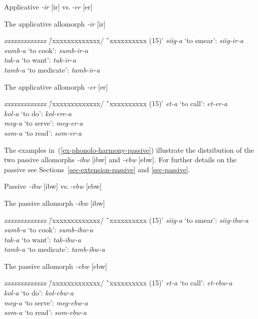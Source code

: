 \ea \label{ex-phonolo-harmony-applicative}
Applicative \textit{-ir} [ir] vs.\,\textit{-er} [er]
\begin{xlist}
\ex The applicative allomorph \textit{-ir} [ir]
\begin{tabbing}
 \textit{xxxxxxxxxxxxx} \= /xxxxxxxxxxxxx/ \=`xxxxxxxxxx (15)'\kill
	 \textit{siig-a}	\>`to smear':	\> \textit{siig-ir-a}\\
	 \textit{sumb-a}\>	`to cook':\>	 \textit{sumb-ir-a}\\
	 \textit{tak-a}	\> `to want':	\>  \textit{tak-ir-a}\\
	 \textit{tamb-a}	\> `to medicate':\>	  \textit{tamb-ir-a} 
\end{tabbing}	

\ex The applicative allomorph \textit{-er} [er]
\begin{tabbing}
 \textit{xxxxxxxxxxxxx} \= /xxxxxxxxxxxxx/ \=`xxxxxxxxxx (15)'\kill
	 \textit{et-a}	\>`to call':	\> \textit{et-er-a}\\
	 \textit{kol-a} \>`to do': \> \textit{kol-ere-a}\\
	 \textit{meg-a} \>`to serve': \>  \textit{meg-er-a}\\
	 \textit{som-a} \>`to read':\>  \textit{som-er-a}
\end{tabbing}	
\end{xlist}
\z

The examples in~(\ref{ex-phonolo-harmony-passive}) illustrate the distribution of the two passive allomorphs \textit{-ibw} [ibw] and \textit{-ebw} [ebw]. 
For further details on the passive see Sections~\ref{sec-extension-passive} and \ref{sec-passive}.

\ea Passive \textit{-ibw} [ibw] vs.\,\textit{-ebw} [ebw] \label{ex-phonolo-harmony-passive}
\begin{xlist}

\ex The passive allomorph  \textit{-ibw} [ibw]\label{ex-phonolo-harmony-passive-ibw}
\begin{tabbing}
 	 \textit{xxxxxxxxxxxxx} \= /xxxxxxxxxxxxx/ \=`xxxxxxxxxx (15)'\kill
	 \textit{siig-a}  \>`to smear': \>  \textit{siig-ibw-a}\\
	 \textit{sumb-a} \> `to cook':  \> \textit{sumb-ibw-a}\\
	 \textit{tak-a}  \>`to want':  \>  \textit{tak-ibw-a}\\
	 \textit{tamb-a}  \>`to medicate':  \>  \textit{tamb-ibw-a}
\end{tabbing}	

\ex The passive allomorph \textit{-ebw} [ebw]\label{ex-phonolo-harmony-passive-ebw}
\begin{tabbing}
 	 \textit{xxxxxxxxxxxxx} \= /xxxxxxxxxxxxx/ \=`xxxxxxxxxx (15)'\kill
	 \textit{et-a} \>`to call': \> \textit{et-ebw-a}\\
	 \textit{kol-a}\> `to do': \> \textit{kol-ebw-a}\\
	 \textit{meg-a} \>`to serve': \>  \textit{meg-ebw-a}\\
	 \textit{som-a}\> `to read': \> \textit{som-ebw-a}
\end{tabbing}
\end{xlist}
\z

